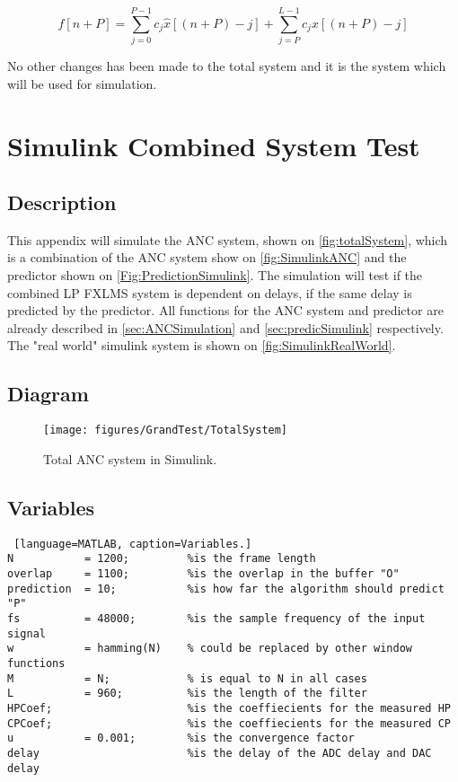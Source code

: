 \begin{equation}\label{eq:CPExpandedapp}
f[n+P]=\sum^{P-1}_{j=0}c_j\hat{x}[(n+P)-j]+\sum^{L-1}_{j=P}c_jx[(n+P)-j]
\end{equation}

No other changes has been made to the total system and it is the system which will be used for simulation.

\newpage
\section{Simulink Combined System Test} \label{sec:SimulinkTotalSystem}

\subsection{Description}
This appendix will simulate the ANC system, shown on \autoref{fig:totalSystem}, which is a combination of the ANC system show on \autoref{fig:SimulinkANC} and the predictor shown on \autoref{Fig:PredictionSimulink}. The simulation will test if the combined LP FXLMS system is dependent on delays, if the same delay is predicted by the predictor. All functions for the ANC system and predictor are already described in \autoref{sec:ANCSimulation} and \autoref{sec:predicSimulink} respectively. The "real world" simulink system is shown on \autoref{fig:SimulinkRealWorld}.

\subsection{Diagram}
\begin{figure}[H]
	\centering
	\texttt{[image: figures/GrandTest/TotalSystem]}
	\caption{Total ANC system in Simulink.}
	\label{fig:SimulinktotalSystem}
\end{figure}


\subsection{Variables}
\begin{lstlisting} [language=MATLAB, caption=Variables.]
N 			= 1200; 		%is the frame length 
overlap 	= 1100;			%is the overlap in the buffer "O"
prediction 	= 10; 			%is how far the algorithm should predict "P"
fs 			= 48000; 		%is the sample frequency of the input signal 
w           = hamming(N)	% could be replaced by other window functions
M           = N;			% is equal to N in all cases
L  			= 960;  	 	%is the length of the filter
HPCoef;  		 			%is the coeffiecients for the measured HP
CPCoef;  		 			%is the coeffiecients for the measured CP
u  			= 0.001;		%is the convergence factor
delay 			 			%is the delay of the ADC delay and DAC delay
\end{lstlisting}

